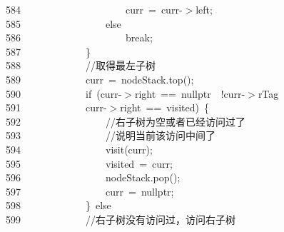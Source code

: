 \documentclass[11pt,a4paper]{ctexart}
\newcommand{\hlstd}[1]{\textcolor[rgb]{0.2,0.2,0.2}{#1}}
\newcommand{\hlslc}[1]{\textcolor[rgb]{0.59,0.59,0.59}{#1}}
\newcommand{\hlopt}[1]{\textcolor[rgb]{0.2,0.2,0.2}{#1}}
\newcommand{\hllin}[1]{\textcolor[rgb]{0.59,0.59,0.59}{#1}}
\newcommand{\hlkwa}[1]{\textcolor[rgb]{0.23,0.42,0.78}{#1}}
\newcommand{\hlkwc}[1]{\textcolor[rgb]{0,0.63,0.31}{#1}}
\newcommand{\hlkwd}[1]{\textcolor[rgb]{0.78,0.23,0.41}{#1}}
\begin{document}
\hllin{584\ }\hlstd{}\hlstd{\ \ \ \ \ \ \ \ \ \ \ \ \ \ \ \ \ \ \ \ }\hlstd{curr\ }\hlopt{=\ }\hlstd{curr}\hlopt{{-}$>$}\hlstd{left}\hlopt{;}\\
\hllin{585\ }\hlstd{}\hlstd{\ \ \ \ \ \ \ \ \ \ \ \ \ \ \ \ }\hlstd{}\hlkwa{else}\\
\hllin{586\ }\hlstd{}\hlstd{\ \ \ \ \ \ \ \ \ \ \ \ \ \ \ \ \ \ \ \ }\hlstd{}\hlkwa{break}\hlstd{}\hlopt{;}\\
\hllin{587\ }\hlstd{}\hlstd{\ \ \ \ \ \ \ \ \ \ \ \ }\hlstd{}\hlopt{\}}\\
\hllin{588\ }\hlstd{}\hlstd{\ \ \ \ \ \ \ \ \ \ \ \ }\hlstd{}\hlslc{//取得最左子树}\\
\hllin{589\ }\hlstd{}\hlstd{\ \ \ \ \ \ \ \ \ \ \ \ }\hlstd{curr\ }\hlopt{=\ }\hlstd{nodeStack}\hlopt{.}\hlstd{}\hlkwd{top}\hlstd{}\hlopt{();}\\
\hllin{590\ }\hlstd{}\hlstd{\ \ \ \ \ \ \ \ \ \ \ \ }\hlstd{}\hlkwa{if\ }\hlstd{}\hlopt{(}\hlstd{curr}\hlopt{{-}$>$}\hlstd{right\ }\hlopt{==\ }\hlstd{}\hlkwc{nullptr\ }\hlstd{}\hlopt{\textbar \textbar \ !}\hlstd{curr}\hlopt{{-}$>$}\hlstd{rTag\ }\hlopt{\textbar \textbar \ }\Righttorque\\
\hllin{591\ }\hlstd{}\hlstd{\ \ \ \ \ \ \ \ \ \ \ \ }\hlstd{curr}\hlopt{{-}$>$}\hlstd{right\ }\hlopt{==\ }\hlstd{visited}\hlopt{)\ \{}\\
\hllin{592\ }\hlstd{}\hlstd{\ \ \ \ \ \ \ \ \ \ \ \ \ \ \ \ }\hlstd{}\hlslc{//右子树为空或者已经访问过了}\\
\hllin{593\ }\hlstd{}\hlstd{\ \ \ \ \ \ \ \ \ \ \ \ \ \ \ \ }\hlstd{}\hlslc{//说明当前该访问中间了}\\
\hllin{594\ }\hlstd{}\hlstd{\ \ \ \ \ \ \ \ \ \ \ \ \ \ \ \ }\hlstd{}\hlkwd{visit}\hlstd{}\hlopt{(}\hlstd{curr}\hlopt{);}\\
\hllin{595\ }\hlstd{}\hlstd{\ \ \ \ \ \ \ \ \ \ \ \ \ \ \ \ }\hlstd{visited\ }\hlopt{=\ }\hlstd{curr}\hlopt{;}\\
\hllin{596\ }\hlstd{}\hlstd{\ \ \ \ \ \ \ \ \ \ \ \ \ \ \ \ }\hlstd{nodeStack}\hlopt{.}\hlstd{}\hlkwd{pop}\hlstd{}\hlopt{();}\\
\hllin{597\ }\hlstd{}\hlstd{\ \ \ \ \ \ \ \ \ \ \ \ \ \ \ \ }\hlstd{curr\ }\hlopt{=\ }\hlstd{}\hlkwc{nullptr}\hlstd{}\hlopt{;}\\
\hllin{598\ }\hlstd{}\hlstd{\ \ \ \ \ \ \ \ \ \ \ \ }\hlstd{}\hlopt{\}\ }\hlstd{}\hlkwa{else\ }\Righttorque\\
\hllin{599\ }\hlstd{}\hlstd{\ \ \ \ \ \ \ \ \ \ \ \ }\hlstd{}\hlslc{//右子树没有访问过，访问右子树}\\
\end{document}
